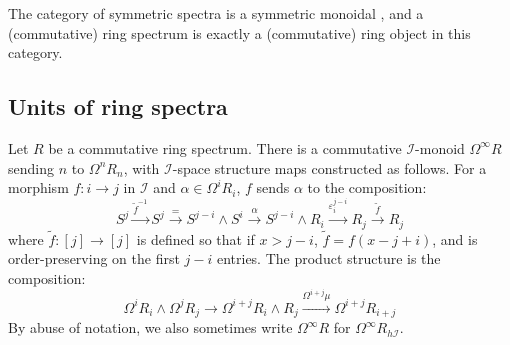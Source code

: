 \documentclass{TPmod}
\newcommand{\eps}{\varepsilon}
\newcommand{\cI}{\mathcal{I}}
\numberwithin{equation}{section}
\begin{document}
    \begin{rmk}
        The category of symmetric spectra is a symmetric monoidal \cite[Section 2]{Hovey-Shipley-Smith}, and a (commutative) ring spectrum is exactly a (commutative) ring object in this category.
    \end{rmk}

\subsection{Units of ring spectra\label{subsec:units}}
    \begin{defn}
        Let $R$ be a commutative ring spectrum. There is a commutative $\cI$-monoid $\Omega^\infty R$ sending $n$ to $\Omega^n R_n$, with $\cI$-space structure maps constructed as follows. For a morphism $f: i \to j$ in $\cI$ and $\alpha \in \Omega^i R_i$, $f$ sends $\alpha$ to the composition:
        \begin{equation}
            S^j \xrightarrow{\tilde f^{-1}} S^j \xrightarrow{=} S^{j-i} \wedge S^i \xrightarrow{\alpha} S^{j-i} \wedge R_i \xrightarrow{\eps_i^{j-i}} R_j \xrightarrow{\tilde f} R_j
        \end{equation}
        where $\tilde f: [j] \to [j]$ is defined so that if $x > j-i$, $\tilde f = f(x-j+i)$, and is order-preserving on the first $j-i$ entries. The product structure is the composition:
        \begin{equation}
            \Omega^i R_i \wedge \Omega^j R_j \to \Omega^{i+j} R_i \wedge R_j \xrightarrow{\Omega^{i+j} \mu} \Omega^{i+j} R_{i+j}
        \end{equation}
        By abuse of notation, we also sometimes write $\Omega^\infty R$ for $\Omega^\infty R_{h\cI}$.
    \end{defn}
\end{document}
